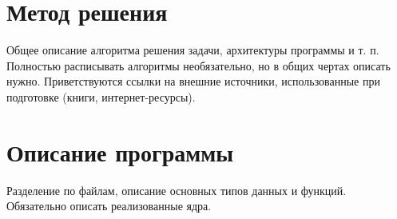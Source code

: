 \section{Метод решения}
Общее описание алгоритма решения задачи, архитектуры программы и т. п. Полностью расписывать алгоритмы необязательно, но в общих чертах описать нужно. Приветствуются ссылки на внешние источники, использованные при подготовке (книги, интернет-ресурсы).

\section{Описание программы}
Разделение по файлам, описание основных типов данных и функций. Обязательно описать реализованные ядра.
